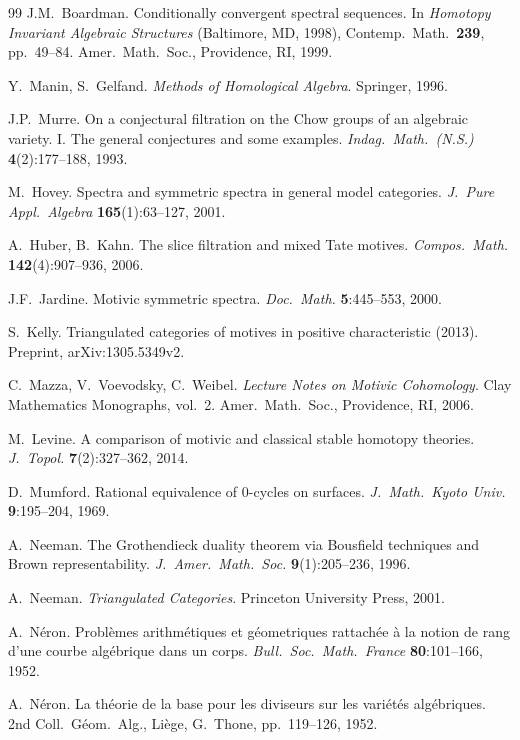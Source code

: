 \documentclass[12pt,a4paper]{article}
\theoremstyle{definition}
\begin{document}
\begin{thebibliography}{99}
J.M.\ Boardman. Conditionally convergent spectral sequences.
In \textit{Homotopy Invariant Algebraic Structures} (Baltimore, MD, 1998),
Contemp.\ Math.\ \textbf{239}, pp.\ 49--84. Amer.\ Math.\ Soc., Providence, RI,
1999.

Y.\ Manin, S.\ Gelfand. \textit{Methods of Homological Algebra}. Springer, 1996.

J.P.\ Murre. On a conjectural filtration on the Chow groups of an algebraic variety.
I. The general conjectures and some examples.
\textit{Indag.\ Math.\ (N.S.)} \textbf{4}(2):177--188, 1993.

M.\ Hovey. Spectra and symmetric spectra in general model categories.
\textit{J.\ Pure Appl.\ Algebra} \textbf{165}(1):63--127, 2001.

A.\ Huber, B.\ Kahn. The slice filtration and mixed Tate motives.
\textit{Compos.\ Math.} \textbf{142}(4):907--936, 2006.

J.F.\ Jardine. Motivic symmetric spectra. \textit{Doc.\ Math.} \textbf{5}:445--553,
2000.

S.\ Kelly. Triangulated categories of motives in positive characteristic (2013).
Preprint, arXiv:1305.5349v2.

C.\ Mazza, V.\ Voevodsky, C.\ Weibel. \textit{Lecture Notes on Motivic Cohomology}.
Clay Mathematics Monographs, vol.\ 2. Amer.\ Math.\ Soc., Providence, RI, 2006.

M.\ Levine. A comparison of motivic and classical stable homotopy theories.
\textit{J.\ Topol.} \textbf{7}(2):327--362, 2014.

D.\ Mumford. Rational equivalence of 0-cycles on surfaces.
\textit{J.\ Math.\ Kyoto Univ.} \textbf{9}:195--204, 1969.

A.\ Neeman. The Grothendieck duality theorem via Bousfield techniques and Brown
representability. \textit{J.\ Amer.\ Math.\ Soc.} \textbf{9}(1):205--236, 1996.

A.\ Neeman. \textit{Triangulated Categories}. Princeton University Press, 2001.

A.\ Néron. Problèmes arithmétiques et géometriques rattachée à la notion de rang
d'une courbe algébrique dans un corps. \textit{Bull.\ Soc.\ Math.\ France}
\textbf{80}:101--166, 1952.

A.\ Néron. La théorie de la base pour les diviseurs sur les variétés algébriques.
2nd Coll.\ Géom.\ Alg., Liège, G.\ Thone, pp.\ 119--126, 1952.


\end{thebibliography}
\end{document}
